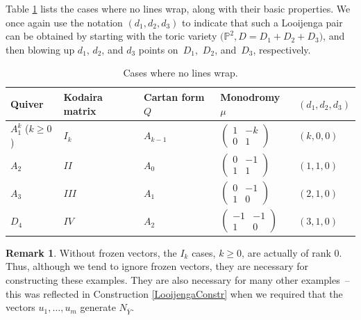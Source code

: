 \documentclass[pdftex]{sigma}
\numberwithin{equation}{section}
\numberwithin{figure}{section}
\numberwithin{table}{section}
\let\?=\overline
\let\bb=\mathbb
\theoremstyle{definition}
\newtheorem{rmk}[thm]{Remark}
\begin{document}
Table \ref{tab:no wrap} lists the cases where no lines wrap, along with their basic properties. We once again use the notation $(d_1,d_2,d_3)$ to indicate that such a Looijenga pair can be obtained by starting with the toric variety $\big(\bb{P}^2,D=D_1+D_2+D_3\big)$, and then blowing up $d_1$, $d_2$, and $d_3$ points on~$D_1$,~$D_2$, and~$D_3$, respectively.
\begin{table}[h]\centering
 \begin{tabular}{ | l | l | l | l | l|}
 \hline
 Quiver & Kodaira matrix & Cartan form $Q$ & Monodromy $\mu$ & $(d_1,d_2,d_3)$ \\ \hline
 $A_1^k$ ($k\geq 0$) & $I_{k}$ & $A_{k-1}$ & 	 $\left(\begin{matrix}
		1 &-k \\
	 0 &1
		\end{matrix}\right)$				 		& $(k,0,0)$ \\ \hline
 $A_2$ & $II$ & $A_0$ & 		$\left(\begin{matrix}
		0 &-1 \\
	 1 &1
		\end{matrix}\right)$		& $(1,1,0)$	 \\ \hline
 $A_3$ & $III$ &$A_1$ &	$\left(\begin{matrix}
		0 &-1 \\
	 1 &0
		\end{matrix}\right)$	 	 & $(2,1,0)$	 \\ \hline
 $D_4$ & $IV$ &$A_2$ & 	$\left(\begin{matrix}
		-1 &-1 \\
	 1 &0
		\end{matrix}\right)$			& $(3,1,0)$			 \\ \hline
 \end{tabular}
 \caption{Cases where no lines wrap.}\label{tab:no wrap}
\end{table}

\begin{rmk}\label{NeedFrozen}
Without frozen vectors, the $I_k$ cases, $k\geq 0$, are actually of rank $0$. Thus, although we tend to ignore frozen vectors, they are necessary for constructing these examples. They are also necessary for many other examples~-- this was reflected in Construction \ref{LooijengaConstr} when we required that the vectors $u_1,\dots,u_m$ generate $N_{\?{Y}}$.
\end{rmk}
\end{document}
